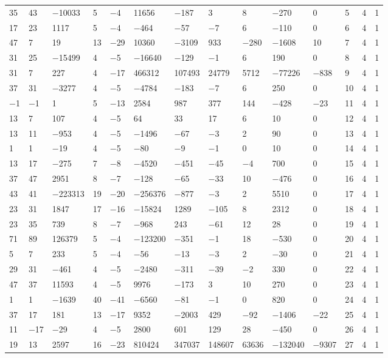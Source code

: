\documentclass[pdftex]{sigma}
\numberwithin{equation}{section}
\theoremstyle{definition}
\numberwithin{table}{section}
\begin{document}
{\begin{paracol}{3}
\begin{supertabular}{|w{c}{.32cm}w{c}{.32cm}w{c}{.32cm}@{\hspace{.5cm}}w{c}{.2cm}w{c}{.2cm}|@{\hspace{\tabcolsep}}HHHHHHw{c}{.17cm}w{c}{.17cm}w{c}{.17cm}|}
			35 & 43 & $-$10033 & 5 & $-$4 & 11656 & $-$187 & 3 & 8 & $-$270 & 0 & 5 & 4 & 1 \\
			17 & 23 & 1117 & 5 & $-$4 & $-$464 & $-$57 & $-$7 & 6 & $-$110 & 0 & 6 & 4 & 1 \\
			47 & 7 & 19 & 13 & $-$29 & 10360 & $-$3109 & 933 & $-$280 & $-$1608 & 10 & 7 & 4 & 1 \\
			31 & 25 & $-$15499 & 4 & $-$5 & $-$16640 & $-$129 & $-$1 & 6 & 190 & 0 & 8 & 4 & 1 \\
			31 & 7 & 227 & 4 & $-$17 & 466312 & 107493 & 24779 & 5712 & $-$77226 & $-$838 & 9 & 4 & 1 \\
			37 & 31 & $-$3277 & 4 & $-$5 & $-$4784 & $-$183 & $-$7 & 6 & 250 & 0 & 10 & 4 & 1 \\
			$-$1 & $-$1 & 1 & 5 & $-$13 & 2584 & 987 & 377 & 144 & $-$428 & $-$23 & 11 & 4 & 1 \\
			13 & 7 & 107 & 4 & $-$5 & 64 & 33 & 17 & 6 & 10 & 0 & 12 & 4 & 1 \\
			13 & 11 & $-$953 & 4 & $-$5 & $-$1496 & $-$67 & $-$3 & 2 & 90 & 0 & 13 & 4 & 1 \\
			1 & 1 & $-$19 & 4 & $-$5 & $-$80 & $-$9 & $-$1 & 0 & 10 & 0 & 14 & 4 & 1 \\
			13 & 17 & $-$275 & 7 & $-$8 & $-$4520 & $-$451 & $-$45 & $-$4 & 700 & 0 & 15 & 4 & 1 \\
			37 & 47 & 2951 & 8 & $-$7 & $-$128 & $-$65 & $-$33 & 10 & $-$476 & 0 & 16 & 4 & 1 \\
			43 & 41 & $-$223313 & 19 & $-$20 & $-$256376 & $-$877 & $-$3 & 2 & 5510 & 0 & 17 & 4 & 1 \\
			23 & 31 & 1847 & 17 & $-$16 & $-$15824 & 1289 & $-$105 & 8 & 2312 & 0 & 18 & 4 & 1 \\
			23 & 35 & 739 & 8 & $-$7 & $-$968 & 243 & $-$61 & 12 & 28 & 0 & 19 & 4 & 1 \\
			71 & 89 & 126379 & 5 & $-$4 & $-$123200 & $-$351 & $-$1 & 18 & $-$530 & 0 & 20 & 4 & 1 \\
			5 & 7 & 233 & 5 & $-$4 & $-$56 & $-$13 & $-$3 & 2 & $-$30 & 0 & 21 & 4 & 1 \\
			29 & 31 & $-$461 & 4 & $-$5 & $-$2480 & $-$311 & $-$39 & $-$2 & 330 & 0 & 22 & 4 & 1 \\
			47 & 37 & 11593 & 4 & $-$5 & 9976 & $-$173 & 3 & 10 & 270 & 0 & 23 & 4 & 1 \\
			1 & 1 & $-$1639 & 40 & $-$41 & $-$6560 & $-$81 & $-$1 & 0 & 820 & 0 & 24 & 4 & 1 \\
			37 & 17 & 181 & 13 & $-$17 & 9352 & $-$2003 & 429 & $-$92 & $-$1406 & $-$22 & 25 & 4 & 1 \\
			11 & $-$17 & $-$29 & 4 & $-$5 & 2800 & 601 & 129 & 28 & $-$450 & 0 & 26 & 4 & 1 \\
			19 & 13 & 2597 & 16 & $-$23 & 810424 & 347037 & 148607 & 63636 & $-$132040 & $-$9307 & 27 & 4 & 1 \\\hline
		\end{supertabular}
		

\end{paracol}}
\end{document}
